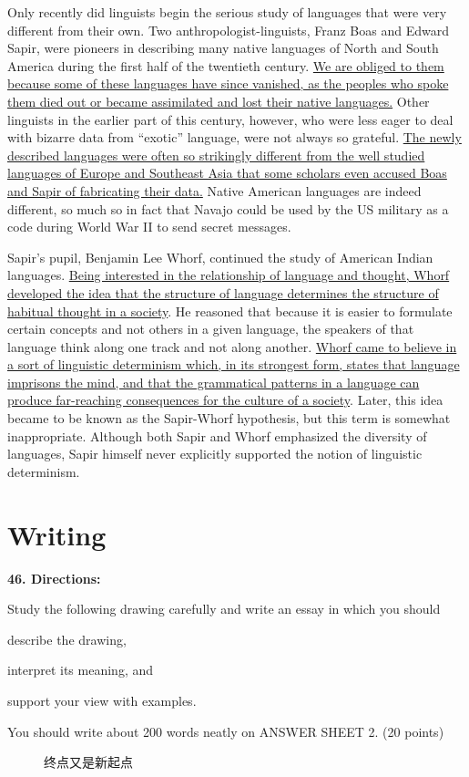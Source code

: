 Only recently did linguists begin the serious study of languages that
were very different from their own. Two anthropologist-linguists, Franz
Boas and Edward Sapir, were pioneers in describing many native languages
of North and South America during the first half of the twentieth
century. \transnum \uline{We are obliged to them because some of these
	languages have since vanished, as the peoples who spoke them died out or
	became assimilated and lost their native languages.} Other linguists in
the earlier part of this century, however, who were less eager to deal
with bizarre data from ``exotic'' language, were not always so grateful.
\transnum \uline{The newly described languages were often so strikingly
	different from the well studied languages of Europe and Southeast Asia
	that some scholars even accused Boas and Sapir of fabricating their
	data.} Native American languages are indeed different, so much so in
fact that Navajo could be used by the US military as a code during World
War II to send secret messages.

Sapir's pupil, Benjamin Lee Whorf, continued the study of American
Indian languages. \transnum \uline{Being interested in the relationship
	of language and thought, Whorf developed the idea that the structure of
	language determines the structure of habitual thought in a society}. He
reasoned that because it is easier to formulate certain concepts and not
others in a given language, the speakers of that language think along
one track and not along another. \transnum \uline{Whorf came to believe
	in a sort of linguistic determinism which, in its strongest form, states
	that language imprisons the mind, and that the grammatical patterns in a
	language can produce far-reaching consequences for the culture of a
	society}. Later, this idea became to be known as the Sapir-Whorf
hypothesis, but this term is somewhat inappropriate. Although both Sapir
and Whorf emphasized the diversity of languages, Sapir himself never
explicitly supported the notion of linguistic determinism.



\section{Writing}


\textbf{46. Directions:}

Study the following drawing carefully and write an essay in
	which you should
\begin{listwrite}
\item 
 describe the drawing,



\item
 interpret its meaning, and



\item
support your view with examples.
\end{listwrite}

You should write about 200 words neatly on ANSWER SHEET 2. (20 points)


\begin{figure}[h!]
	\centering
	
	\caption*{终点又是新起点}
\end{figure}


\checkpagenumber